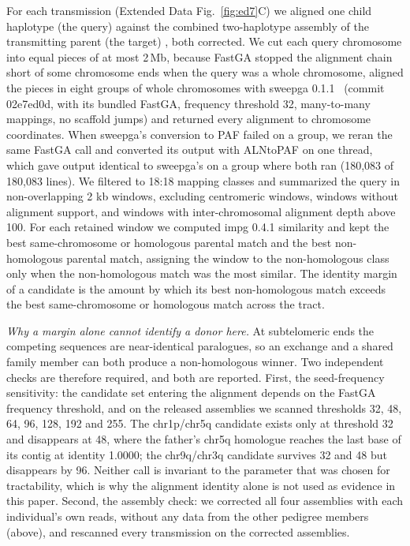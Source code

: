 \documentclass[pdflatex,mathphys]{jnl}
\begin{document}
For each transmission (Extended Data Fig.~\ref{fig:ed7}C) we aligned one child haplotype
(the query) against the combined two-haplotype assembly of the transmitting
parent (the target) \cite{Cechova2025}, both corrected. We cut each query chromosome into equal
pieces of at most 2\,Mb, because FastGA stopped the alignment chain short of some chromosome ends
when the query was a whole chromosome, aligned the pieces in eight groups of whole chromosomes with
sweepga 0.1.1~\cite{sweepga} (commit 02e7ed0d, with its bundled FastGA, frequency threshold 32,
many-to-many mappings, no scaffold jumps) and returned every alignment to chromosome coordinates.
When sweepga's conversion to PAF failed on a group, we reran the same FastGA call and converted its
output with ALNtoPAF on one thread, which gave output identical to sweepga's on a group where both ran (180,083
of 180,083 lines). We filtered to 18:18 mapping classes and summarized the
query in non-overlapping 2 kb windows, excluding centromeric windows, windows
without alignment support, and windows with inter-chromosomal alignment depth
above 100. For each retained window we computed impg 0.4.1 similarity and kept
the best same-chromosome or homologous parental match and the best
non-homologous parental match, assigning the window to the non-homologous class
only when the non-homologous match was the most similar. The identity margin of
a candidate is the amount by which its best non-homologous match exceeds
the best same-chromosome or homologous match across the tract.

\emph{Why a margin alone cannot identify a donor here.} At subtelomeric ends the competing sequences are
near-identical paralogues, so an exchange and a shared family member can both produce a non-homologous
winner. Two independent checks are therefore required, and both are reported. First, the seed-frequency
sensitivity: the candidate set entering the alignment depends on the FastGA frequency threshold, and on
the released assemblies we scanned thresholds 32, 48, 64, 96, 128, 192 and 255. The chr1p/chr5q candidate exists only at threshold
32 and disappears at 48, where the father's chr5q homologue reaches the last base of its contig at
identity 1.0000; the chr9q/chr3q candidate survives 32 and 48 but disappears by 96. Neither call is
invariant to the parameter that was chosen for tractability, which is why the alignment identity alone is
not used as evidence in this paper. Second, the assembly check: we corrected all four assemblies with each
individual's own reads, without any data from the other pedigree members (above), and rescanned every
transmission on the corrected assemblies.
\end{document}
